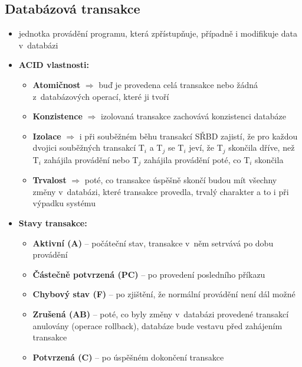 \documentclass[a4paper,10pt]{article}
\newcommand{\pojem}[2]{\item \textbf{#1:}\quad #2}
\begin{document}
    \subsection{Databázová transakce}
      \begin{itemize}
        \item jednotka provádění programu, která zpřístupňuje, případně i modifikuje data v~databázi

        \pojem{ACID vlastnosti}
        \begin{itemize}
          \item \textbf{Atomičnost} $\Rightarrow$ buď je provedena celá transakce nebo žádná z~databázových operací, které ji tvoří
          \item \textbf{Konzistence} $\Rightarrow$ izolovaná transakce zachovává konzistenci databáze
          \item \textbf{Izolace} $\Rightarrow$ i při souběžném běhu transakcí SŘBD zajistí, že pro každou dvojici souběžných transakcí T$_i$ a T$_j$ se T$_i$ jeví, že T$_j$ skončila dříve, než T$_i$ zahájila provádění nebo T$_j$ zahájila provádění poté, co T$_i$ skončila
          \item \textbf{Trvalost} $\Rightarrow$ poté, co transakce úspěšně skončí budou mít všechny změny v~databázi, které transakce provedla, trvalý charakter a to i při výpadku systému
        \end{itemize}
        \pagebreak

        \pojem{Stavy transakce}
        \begin{figure}[h!]
          \centering
        \end{figure}

        \begin{itemize}
          \item \textbf{Aktivní (A)} -- počáteční stav, transakce v~něm setrvává po dobu provádění
          \item \textbf{Částečně potvrzená (PC)} -- po provedení posledního příkazu
          \item \textbf{Chybový stav (F)} -- po zjištění, že normální provádění není dál možné
          \item \textbf{Zrušená (AB)} -- poté, co byly změny v~databázi provedené transakcí anulovány (operace rollback), databáze bude vestavu před zahájením transakce
          \item \textbf{Potvrzená (C)} -- po úspěšném dokončení transakce
        \end{itemize}
      \end{itemize}
\end{document}
